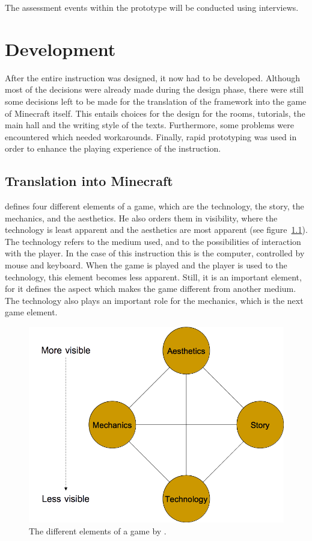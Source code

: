 \documentclass[11pt,twoside]{report} %
\begin{document}
The assessment events within the prototype will be conducted using interviews.


\chapter{Development}
\thispagestyle{fancy}

After the entire instruction was designed, it now had to be developed. Although most of the decisions were already made during the design phase, there were still some decisions left to be made for the translation of the framework into the game of Minecraft itself. This entails choices for the design for the rooms, tutorials, the main hall and the writing style of the texts. Furthermore, some problems were encountered which needed workarounds. Finally, rapid prototyping was used in order to enhance the playing experience of the instruction.

\section{Translation into Minecraft}

 defines four different elements of a game, which are the technology, the story, the mechanics, and the aesthetics. He also orders them in visibility, where the technology is least apparent and the aesthetics are most apparent (see figure~\ref{fig:game-elements}). The technology refers to the medium used, and to the possibilities of interaction with the player. In the case of this instruction this is the computer, controlled by mouse and keyboard. When the game is played and the player is used to the technology, this element becomes less apparent. Still, it is an important element, for it defines the aspect which makes the game different from another medium. The technology also plays an important role for the mechanics, which is the next game element.

\begin{figure}[h]
\centering
\includegraphics[width=.5\textwidth]{game-elements}
\caption{The different elements of a game by \protect{}.\label{fig:game-elements}}
\end{figure}
\end{document}
